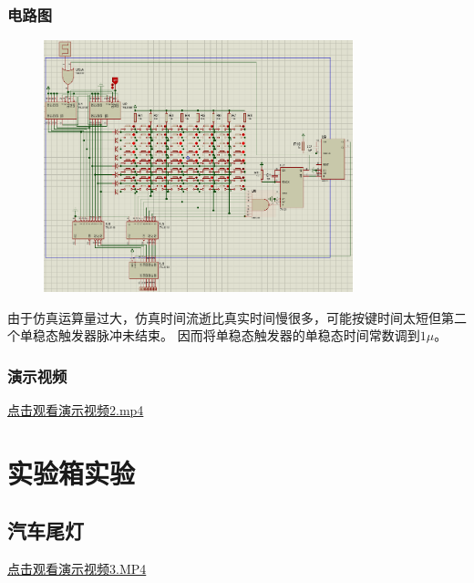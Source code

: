 \documentclass[UTF8, a4paper, 11pt]{article}
\begin{document}
\subsubsection{电路图}
\begin{figure}[H]
    \centering
    \includegraphics[width=0.8\textwidth]{ex10.2电路图.png}
\end{figure}
由于仿真运算量过大，仿真时间流逝比真实时间慢很多，可能按键时间太短但第二个单稳态触发器脉冲未结束。
因而将单稳态触发器的单稳态时间常数调到$1\mu$。
\subsubsection{演示视频}
\href{2.mp4}{点击观看演示视频2.mp4}
\section{实验箱实验}
\subsection{汽车尾灯}
\href{3.MP4}{点击观看演示视频3.MP4}
%
%
\end{document}
